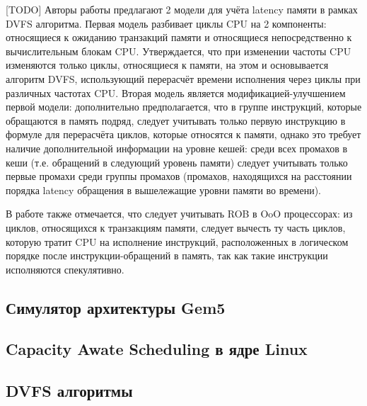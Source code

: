[TODO] Авторы работы \cite{keramidas2010interval} предлагают 2 модели для учёта latency памяти
в рамках DVFS алгоритма. Первая модель разбивает циклы CPU на 2 компоненты: относящиеся
к ожиданию транзакций памяти и относящиеся непосредственно к вычислительным блокам CPU.
Утверждается, что при изменении частоты CPU изменяются только циклы, относящиеся к памяти,
на этом и основывается алгоритм DVFS, использующий перерасчёт времени исполнения через
циклы при различных частотах CPU. Вторая модель является модификацией-улучшением первой модели:
дополнительно предполагается, что в группе инструкций, которые обращаются в память подряд,
следует учитывать только первую инструкцию в формуле для перерасчёта циклов, которые относятся
к памяти, однако это требует наличие дополнительной информации на уровне кешей: среди всех
промахов в кеши (т.е. обращений в следующий уровень памяти) следует учитывать только первые
промахи среди группы промахов (промахов, находящихся на расстоянии порядка latency обращения
в вышележащие уровни памяти во времени).

В работе также отмечается, что следует учитывать ROB в OoO процессорах: из циклов, относящихся к
транзакциям памяти, следует вычесть ту часть циклов, которую тратит CPU на исполнение
инструкций, расположенных в логическом порядке после инструкции-обращений в память,
так как такие инструкции исполняются спекулятивно.



\subsection{Симулятор архитектуры Gem5}

\subsection{Capacity Awate Scheduling в ядре Linux}

\subsection{DVFS алгоритмы}





\newpage
